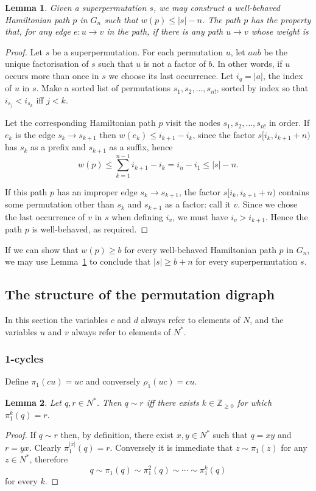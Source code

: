 \documentclass[a4paper]{article}
\newtheorem{lemma}{Lemma}
\theoremstyle{definition}
\theoremstyle{remark}
\begin{document}
\begin{lemma}\label{lemma:transfer}
    Given a superpermutation $s$, we may construct a well-behaved Hamiltonian path $p$ in $G_n$ such that $w(p) \le |s|-n$. The path $p$ has the property that, for any edge $e: u\to v$ in the path, if there is any path $u\to v$ whose weight is 
\end{lemma}
\begin{proof}
Let $s$ be a superpermutation. For each permutation $u$, let $aub$ be the unique factorisation of $s$ such that $u$ is not a factor of $b$. In other words, if $u$ occurs more than once in $s$ we choose its last occurrence. Let $i_q = |a|$, the index of $u$ in $s$. Make a sorted list of permutations $s_1, s_2, \dots, s_{n!}$, sorted by index so that $i_{s_j} < i_{s_k}$ iff $j < k$.

Let the corresponding Hamiltonian path $p$ visit the nodes $s_1, s_2, \dots, s_{n!}$ in order. If $e_k$ is the edge $s_k \to s_{k+1}$ then $w(e_k) \le i_{k+1} - i_k$, since the factor $s[i_k, i_{k+1} + n)$ has $s_k$ as a prefix and $s_{k+1}$ as a suffix, hence
\[
    w(p) \le \sum_{k=1}^{n-1} i_{k+1} - i_k = i_n - i_1 \le |s| - n.
\]

If this path $p$ has an improper edge $s_k \to s_{k+1}$, the factor $s[i_k, i_{k+1} + n)$ contains some permutation other than $s_k$ and $s_{k+1}$ as a factor: call it $v$. Since we chose the last occurrence of $v$ in $s$ when defining $i_v$, we must have $i_v > i_{k+1}$. Hence the path $p$ is well-behaved, as required.
\end{proof}

If we can show that $w(p) \ge b$ for every well-behaved Hamiltonian path $p$ in $G_n$, we may use Lemma~\ref{lemma:transfer} to conclude that $|s|\ge b+n$ for every superpermutation $s$.

\subsection{The structure of the permutation digraph}
In this section the variables $c$ and $d$ always refer to elements of $N$, and the variables $u$ and $v$ always refer to elements of $N^*$.
\subsubsection{1-cycles}
Define $\pi_1(cu) = uc$ and conversely $\rho_1(uc)=cu$.

\begin{lemma}\label{lem:pi1}
Let $q, r\in N^*$. Then $q\sim r$ iff there exists $k\in\mathbb{Z}_{\ge 0}$ for which $\pi_1^k(q)=r$.
\end{lemma}
\begin{proof}
If $q\sim r$ then, by definition, there exist $x, y\in N^*$ such that $q=xy$ and $r=yx$. Clearly $\pi_1^{|x|}(q)=r$. Conversely it is immediate that $z\sim\pi_1(z)$ for any $z\in N^*$, therefore
\[
    q \sim \pi_1(q) \sim \pi_1^2(q) \sim\cdots\sim \pi_1^k(q)
\]
for every $k$.
\end{proof}
\end{document}
